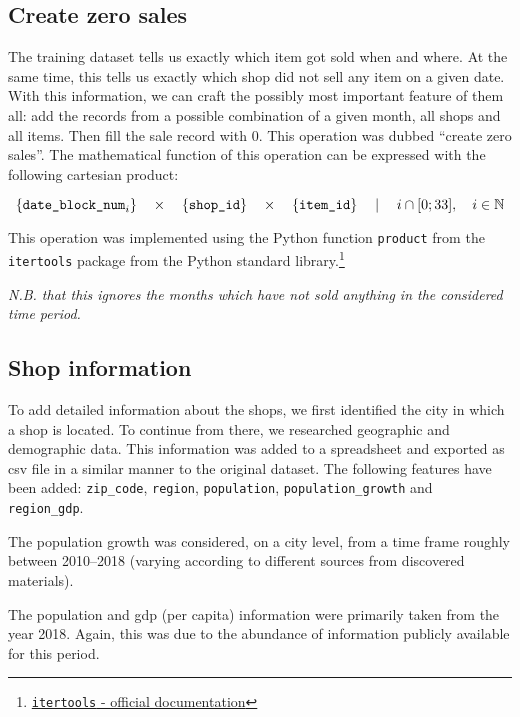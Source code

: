 \subsection{Create zero sales}\label{zerosales}

The training dataset tells us exactly which item got sold when and where. At the same time, this tells us exactly which shop did not sell any item on a given date.
With this information, we can craft the possibly most important feature of them all: add the records from a possible combination of a given month, all shops and all items. Then fill the sale record with 0. This operation was dubbed \enquote{create zero sales}.
The mathematical function of this operation can be expressed with the following cartesian product:

\vspace*{-4mm}
$$
\{\text{\texttt{date\_block\_num}}_i\}
\quad \times \quad
\{{\text{\texttt{shop\_id}}}\}
\quad  \times \quad 
\{{\text{\texttt{item\_id}}}\}
\quad \mid \quad
i \cap [0; 33], \quad i \in \mathbb{N}
$$

This operation was implemented using the Python function \texttt{product} from the \texttt{itertools} package from the Python standard library.\footnote{\href{https://docs.python.org/3/library/itertools.html\#itertools.product}{\texttt{itertools} - official documentation}}

\noindent \textit{N.B. that this ignores the months which have not sold anything in the considered time period.}

\subsection{Shop information}

To add detailed information about the shops, we first identified the city in which a shop is located. To continue from there, we researched geographic and demographic data. This information was added to a spreadsheet and exported as \acrfull{csv} file in a similar manner to the original dataset. The following features have been added: \texttt{zip\_code}, \texttt{region}, \texttt{population}, \texttt{population\_growth} and \texttt{region\_gdp}.

The population growth was considered, on a city level, from a time frame roughly between 2010--2018 (varying according to different sources from discovered materials).

The population and gdp (per capita) information were primarily taken from the year 2018. Again, this was due to the abundance of information publicly available for this period.

